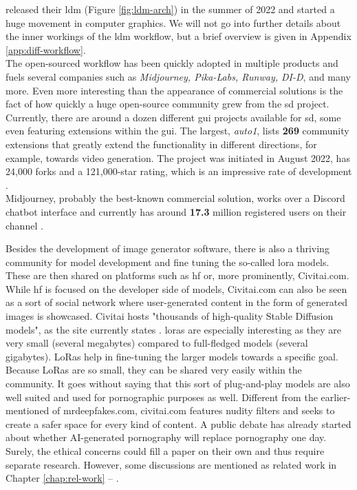 \documentclass[
  a4paper,  %
  twoside,  %
  bibliography=totoc,
  headsepline,
  cleardoublepage=empty,
  parskip=half,
  draft=false
]{scrbook}
\begin{document}
\citet{rombachHighResolutionImageSynthesis2022} released their \gls{ldm} (Figure \ref{fig:ldm-arch}) in the summer of 2022 and started a huge movement in computer graphics. We will not go into further details about the inner workings of the \gls{ldm} workflow, but a brief overview is given in Appendix \ref{app:diff-workflow}.\\
The open-sourced workflow has been quickly adopted in multiple products and fuels several companies such as \textit{Midjourney, Pika-Labs, Runway, DI-D}, and many more. Even more interesting than the appearance of commercial solutions is the fact of how quickly a huge open-source community grew from the \gls{sd} project. Currently, there are around a dozen different \gls{gui} projects available for \gls{sd}, some even featuring extensions within the \gls{gui}. The largest, \textit{\gls{auto1}}, lists \textbf{269} community extensions that greatly extend the functionality in different directions, for example, towards video generation. The project was initiated in August 2022, has 24,000 forks and a 121,000-star rating, which is an impressive rate of development \cite{AUTOMATIC1111StablediffusionwebuiStable}. \\
Midjourney, probably the best-known commercial solution, works over a Discord chatbot interface and currently has around \textbf{17.3} million registered users on their channel \cite{midjourneyJoinMidjourneyDiscord}.

Besides the development of image generator software, there is also a thriving community for model development and fine tuning the so-called \gls{lora} models. These are then shared on platforms such as \gls{hf} or, more prominently, Civitai.com. While \gls{hf} is focused on the developer side of models, Civitai.com can also be seen as a sort of social network where user-generated content in the form of generated images is showcased. Civitai hosts "thousands of high-quality Stable Diffusion models", as the site currently states \cite{CivitaiHomeOpenSource}. \gls{lora}s are especially interesting as they are very small (several megabytes) compared to full-fledged models (several gigabytes). LoRas help in fine-tuning the larger models towards a specific goal. Because LoRas are so small, they can be shared very easily within the community. It goes without saying that this sort of plug-and-play models are also well suited and used for pornographic purposes as well. Different from the earlier-mentioned of mrdeepfakes.com, civitai.com features nudity filters and seeks to create a safer space for every kind of content. A public debate has already started about whether AI-generated pornography will replace pornography one day. Surely, the ethical concerns could fill a paper on their own and thus require separate research. However, some discussions are mentioned as related work in Chapter \ref{chap:rel-work} – .
\end{document}
